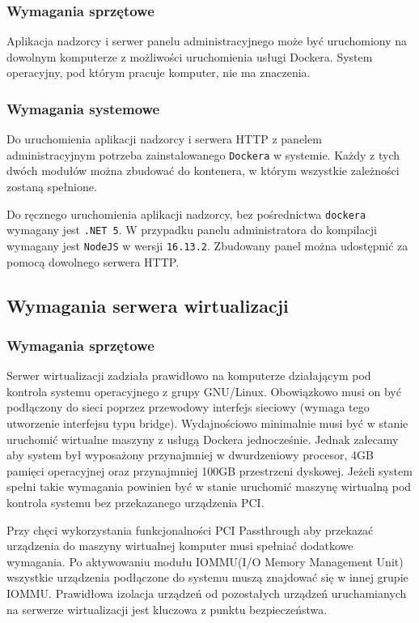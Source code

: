 \documentclass[../opis-rozwiazania.tex]{subfiles}
\begin{document}
\subsubsection{Wymagania sprzętowe}
Aplikacja nadzorcy i serwer panelu administracyjnego może być uruchomiony na dowolnym komputerze z możliwości uruchomienia usługi Dockera.
System operacyjny, pod którym pracuje komputer, nie ma znaczenia.

\subsubsection{Wymagania systemowe}
Do uruchomienia aplikacji nadzorcy i serwera HTTP z panelem administracyjnym potrzeba zainstalowanego \texttt{Dockera} w systemie.
Każdy z tych dwóch modułów można zbudować do kontenera, w którym wszystkie zależności zostaną spełnione.

Do ręcznego uruchomienia aplikacji nadzorcy, bez pośrednictwa \texttt{dockera} wymagany jest \texttt{.NET 5}. W przypadku panelu administratora do kompilacji wymagany jest \texttt{NodeJS} w wersji \texttt{16.13.2}. Zbudowany panel można udostępnić za pomocą dowolnego serwera HTTP.

\subsection{Wymagania serwera wirtualizacji}
\label{system_requirements.virtsrv_rquirements}

\subsubsection{Wymagania sprzętowe}
Serwer wirtualizacji zadziała prawidłowo na komputerze działającym pod kontrola systemu operacyjnego z grupy GNU/Linux.
Obowiązkowo musi on być podłączony do sieci poprzez przewodowy interfejs sieciowy (wymaga tego utworzenie interfejsu typu bridge).
Wydajnościowo minimalnie musi być w stanie uruchomić wirtualne maszyny z usługą Dockera jednocześnie.
Jednak zalecamy aby system był wyposażony przynajmniej w dwurdzeniowy procesor, 4GB pamięci operacyjnej oraz przynajmniej 100GB przestrzeni dyskowej.
Jeżeli system spełni takie wymagania powinien być w stanie uruchomić maszynę wirtualną pod kontrola systemu bez przekazanego urządzenia PCI.

Przy chęci wykorzystania funkcjonalności PCI Passthrough \parencite{pci-passthrough} aby przekazać urządzenia do maszyny wirtualnej komputer musi spełniać dodatkowe wymagania.
Po aktywowaniu modułu IOMMU(I/O Memory Management Unit) \parencite{amd-iommu} wszystkie urządzenia podłączone do systemu muszą znajdować się w innej grupie IOMMU.
Prawidłowa izolacja urządzeń od pozostałych urządzeń uruchamianych na serwerze wirtualizacji jest kluczowa z punktu bezpieczeństwa.
\end{document}
